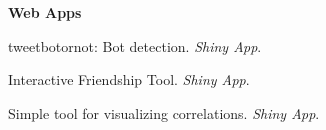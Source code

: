   \textbf{Web Apps}
    \begin{innerlist}
      \item tweetbotornot: Bot detection. \textit{Shiny App}. \href{https://mikewk.shinyapps.io/botornot/}{\faExternalLink}
      \item Interactive Friendship Tool. \textit{Shiny App}. \href{https://mikewk.shinyapps.io/friendship/}{\faExternalLink}
      \item Simple tool for visualizing correlations. \textit{Shiny App}. \href{https://mikewk.shinyapps.io/correlation/}{\faExternalLink}
    \end{innerlist}
